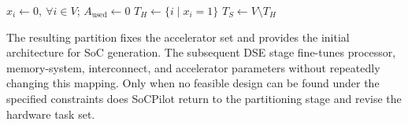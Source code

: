 \begin{algorithm}
\caption{Hardware/Software Partitioning}
\label{alg:hw-sw-partitioning}

$x_i\leftarrow 0,\ \forall i\in V$; $A_{\mathrm{used}}\leftarrow 0$\;
$T_H\leftarrow\{i\mid x_i=1\}$\;
$T_S\leftarrow V\setminus T_H$\;
\end{algorithm}

The resulting partition fixes the accelerator set and provides the initial architecture for SoC generation. The subsequent DSE stage fine-tunes processor, memory-system, interconnect, and accelerator parameters without repeatedly changing this mapping. Only when no feasible design can be found under the specified constraints does SoCPilot return to the partitioning stage and revise the hardware task set.

